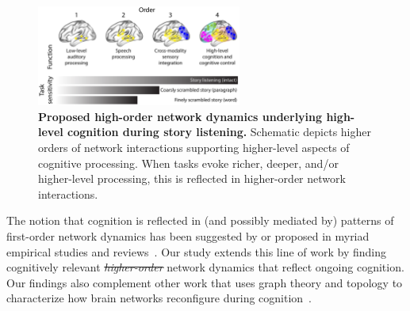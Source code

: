 \documentclass[english]{article}
\providecommand{\DIFaddtex}[1]{{\protect\color{blue}\uwave{#1}}} %
\providecommand{\DIFdeltex}[1]{{\protect\color{red}\sout{#1}}}                      %
\providecommand{\DIFaddbegin}{} %
\providecommand{\DIFaddend}{} %
\providecommand{\DIFdelbegin}{} %
\providecommand{\DIFdelend}{} %
\providecommand{\DIFadd}[1]{\texorpdfstring{\DIFaddtex{#1}}{#1}} %
\providecommand{\DIFdel}[1]{\texorpdfstring{\DIFdeltex{#1}}{}} %
\newcommand{\DIFscaledelfig}{0.5}
\newlength{\DIFdelgraphicswidth} %
\newlength{\DIFdelgraphicsheight} %
\newcommand{\DIFaddincludegraphics}[2][]{{\color{blue}\fbox{\DIFOincludegraphics[#1]{#2}}}} %
\newcommand{\DIFdelincludegraphics}[2][]{%
\sbox{\DIFdelgraphicsbox}{\DIFOincludegraphics[#1]{#2}}%
\settoboxwidth{\DIFdelgraphicswidth}{\DIFdelgraphicsbox} %
\settoboxtotalheight{\DIFdelgraphicsheight}{\DIFdelgraphicsbox} %
\scalebox{\DIFscaledelfig}{%
\parbox[b]{\DIFdelgraphicswidth}{\usebox{\DIFdelgraphicsbox}\\[-\baselineskip] \rule{\DIFdelgraphicswidth}{0em}}\llap{\resizebox{\DIFdelgraphicswidth}{\DIFdelgraphicsheight}{%
\setlength{\unitlength}{\DIFdelgraphicswidth}%
\begin{picture}(1,1)%
\thicklines\linethickness{2pt} %
{\color[rgb]{1,0,0}\put(0,0){\framebox(1,1){}}}%
{\color[rgb]{1,0,0}\put(0,0){\line( 1,1){1}}}%
{\color[rgb]{1,0,0}\put(0,1){\line(1,-1){1}}}%
\end{picture}%
}\hspace*{3pt}}} %
} %
\DeclareRobustCommand{\DIFaddbegin}{\DIFOaddbegin \let\includegraphics\DIFaddincludegraphics} %
\DeclareRobustCommand{\DIFaddend}{\DIFOaddend \let\includegraphics\DIFOincludegraphics} %
\DeclareRobustCommand{\DIFdelbegin}{\DIFOdelbegin \let\includegraphics\DIFdelincludegraphics} %
\DeclareRobustCommand{\DIFdelend}{\DIFOaddend \let\includegraphics\DIFOincludegraphics} %
\begin{document}
\begin{figure}
[tp]
  \centering
  \includegraphics[width=0.6\textwidth]{figs/discussion}
  \caption{\textbf{Proposed high-order network dynamics underlying
       high-level cognition during story listening.}  Schematic depicts
    higher orders of
    network interactions supporting higher-level aspects of cognitive
    processing.  When tasks evoke richer, deeper, and/or higher-level
    processing, this is reflected in higher-order network
    interactions.}
  \label{fig:discussion}

\end{figure}

The notion that cognition is reflected in (and possibly mediated by)
patterns of first-order network dynamics has been suggested by or
proposed in myriad empirical studies and
reviews~\citep[e.g.,][]{DemeEtal19, Turk13, LuriEtal18, FongEtal19,
  ParkEtal18b, PretEtal17, MannEtal18, RoyEtal19, LiegEtal19, ZouEtal19,
  ChanGlov10, GonzEtal19, McIn00, BresKels01}.  Our study extends this line of work by
finding cognitively relevant \DIFdelbegin \textit{\DIFdel{higher-order}} %
\DIFdelend \DIFaddbegin \DIFadd{higher-order }\DIFaddend network dynamics
that reflect ongoing cognition.  Our findings also complement other work
that uses graph theory and topology to characterize how brain networks
reconfigure during cognition~\citep[e.g.,][]{BassEtal06, ZhenEtal19,
  McInJirs19, TokeSomm19, SizeEtal18, ReimEtal17, BetzEtal19}.
\end{document}
